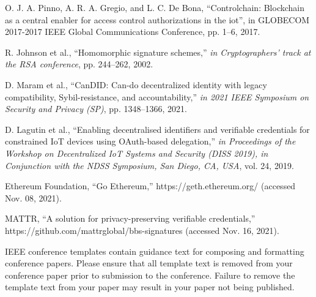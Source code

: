 \documentclass[conference, dvipdfmx]{IEEEtran} %
\begin{document}
\begin{sloppypar}
\begin{thebibliography}{00}
		O. J. A. Pinno, A. R. A. Gregio, and L. C. De Bona,
		\textquotedblleft Controlchain: Blockchain as a central enabler for access control authorizations in the iot\textquotedblright, 
	    in GLOBECOM 2017-2017 IEEE Global Communications Conference, pp. 1–6, 2017.
  
    R. Johnson et al., ``Homomorphic signature schemes,'' {\em in Cryptographers’ track at the RSA conference}, pp. 244–262, 2002.
  
    D. Maram et al., ``CanDID: Can-do decentralized identity with legacy compatibility, Sybil-resistance, and accountability,'' {\em in 2021 IEEE Symposium on Security and Privacy (SP)}, pp. 1348–1366, 2021.
  
    D. Lagutin et al., ``Enabling decentralised identifiers and verifiable credentials for constrained IoT devices using OAuth-based delegation,'' {\em in Proceedings of the Workshop on Decentralized IoT Systems and Security (DISS 2019), in Conjunction with the NDSS Symposium, San Diego, CA, USA}, vol. 24, 2019.
  
    Ethereum Foundation, ``Go Ethereum,'' https://geth.ethereum.org/ (accessed Nov. 08, 2021).
  
    MATTR, ``A solution for privacy-preserving verifiable credentials,''  https://github.com/mattrglobal/bbs-signatures (accessed Nov. 16, 2021).
\end{thebibliography}
\vspace{12pt}
\color{red}
IEEE conference templates contain guidance text for composing and formatting conference papers. Please ensure that all template text is removed from your conference paper prior to submission to the conference. Failure to remove the template text from your paper may result in your paper not being published.

\end{sloppypar}
\end{document}
